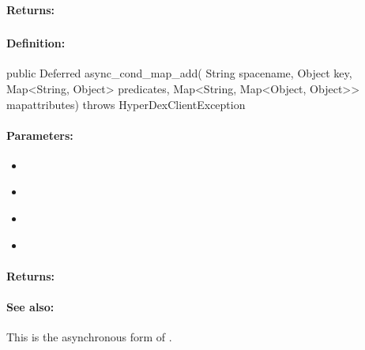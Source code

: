 \paragraph{Returns:}


\pagebreak
\subsubsection{}
\label{api:java:async_cond_map_add}


\paragraph{Definition:}
\begin{javacode}
public Deferred async_cond_map_add(
        String spacename,
        Object key,
        Map<String, Object> predicates,
        Map<String, Map<Object, Object>> mapattributes) throws HyperDexClientException
\end{javacode}

\paragraph{Parameters:}
\begin{itemize}[noitemsep]
\item {}\\

\item {}\\

\item {}\\

\item {}\\

\end{itemize}

\paragraph{Returns:}


\paragraph{See also:}  This is the asynchronous form of .

